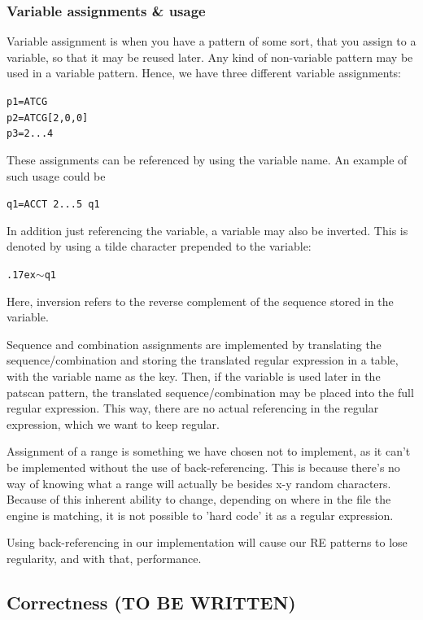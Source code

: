 \documentclass[12pt]{article}
\theoremstyle{definition}
\begin{document}
\subsubsection{Variable assignments \& usage}

Variable assignment is when you have a pattern of some sort, that you assign to a variable, so that it may be reused later. Any kind of non-variable pattern may be used in a variable pattern. Hence, we have three different variable assignments:

\texttt{p1=ATCG} \\
\texttt{p2=ATCG[2,0,0]} \\
\texttt{p3=2...4}

These assignments can be referenced by using the variable name. An example of such usage could be

\texttt{q1=ACCT 2...5 q1}

In addition just referencing the variable, a variable may also be inverted. This is denoted by using a tilde character prepended to the variable:

\texttt{{\raise.17ex\hbox{$\scriptstyle\mathtt{\sim}$}}q1}

Here, inversion refers to the reverse complement of the sequence stored in the variable.

Sequence and combination assignments are implemented by translating the sequence/combination and storing the translated regular expression in a table, with the variable name as the key. Then, if the variable is used later in the patscan pattern, the translated sequence/combination may be placed into the full regular expression. This way, there are no actual referencing in the regular expression, which we want to keep regular.

Assignment of a range is something we have chosen not to implement, as it can't be implemented without the use of back-referencing. This is because there's no way of knowing what a range will actually be besides x-y random characters. Because of this inherent ability to change, depending on where in the file the engine is matching, it is not possible to 'hard code' it as a regular expression.

Using back-referencing in our implementation will cause our RE patterns to lose regularity, and with that, performance.

\subsection{Correctness (TO BE WRITTEN)}
\end{document}
